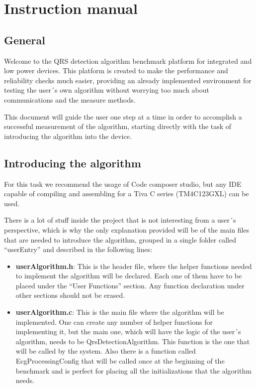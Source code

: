 
\pagestyle{fancy}
\fancyhead[LE,RO]{\thepage}
\fancyhead[LO]{\nouppercase{\rightmark}}

\chapter{Instruction manual}

\minitoc

\section{General}
Welcome to the QRS detection algorithm benchmark platform for integrated and low power devices. This platform is created to make the performance and reliability checks much easier, providing an already implemented environment for testing the user´s own algorithm without worrying too much about communications and the measure methods.

This document will guide the user one step at a time in order to accomplish a successful measurement of the algorithm, starting directly with the task of introducing the algorithm into the device.

\section{Introducing the algorithm}
For this task we recommend the usage of Code composer studio, but any IDE capable of compiling and assembling for a Tiva C series (TM4C123GXL) can be used.

There is a lot of stuff inside the project that is not interesting from a user´s perspective, which is why the only explanation provided will be of the main files that are needed to introduce the algorithm, grouped in a single folder called “userEntry” and described in the following lines:

\begin{itemize}
    \item \textbf{userAlgorithm.h}: This is the header file, where the helper functions needed to implement the algorithm will be declared. Each one of them have to be placed under the “User Functions” section. Any function declaration under other sections should not be erased.
    \item \textbf{userAlgorithm.c}: This is the main file where the algorithm will be implemented. One can create any number of helper functions for implementing it, but the main one, which will have the logic of the user´s algorithm, needs to be QrsDetectionAlgorithm. This function is the one that will be called by the system. Also there is a function called EcgProcessingConfig that will be called once at the beginning of the benchmark and is perfect for placing all the initializations that the algorithm needs. 
\end{itemize}

